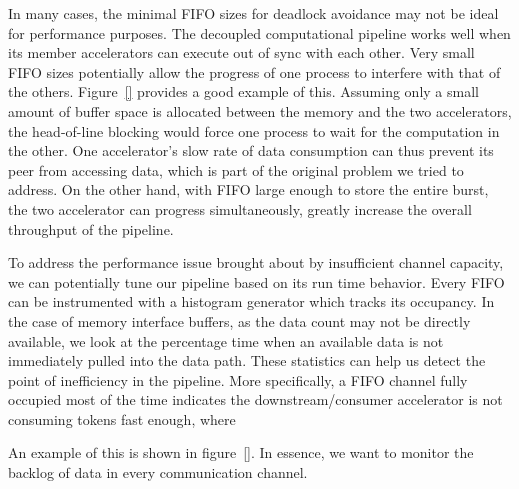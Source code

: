 In many cases, the minimal FIFO sizes for deadlock avoidance may not be ideal for performance purposes. The decoupled computational pipeline works well when its member accelerators
can execute out of sync with each other. Very small FIFO sizes potentially allow the progress
of one process to interfere with that of the others. Figure~\ref{} provides a good example
of this. Assuming only a small amount of buffer space is allocated between the memory
and the two accelerators, the head-of-line blocking would force one process to wait for
the computation in the other. One accelerator's slow rate of data consumption can thus 
prevent its peer from accessing data, which is part of the original problem we tried to address.
On the other hand, with FIFO large enough to store the entire burst, the two accelerator
can progress simultaneously, greatly increase the overall throughput of the pipeline.

To address the performance issue brought about by insufficient channel capacity, we can potentially tune our pipeline based on its run time behavior. 
Every 
FIFO can be instrumented with a histogram generator
which tracks its occupancy. 
In the case of 
memory interface buffers, as the data count may not be directly available, we look at the percentage time when an available data is not immediately pulled into the data path. These statistics can help us detect the
point of inefficiency in the pipeline. More specifically, a FIFO channel fully occupied most of
the time indicates the downstream/consumer accelerator
is not consuming tokens fast enough, where


An example of this is shown in figure~\ref{}. In essence, we want to monitor the backlog of data
in every communication channel. 




























